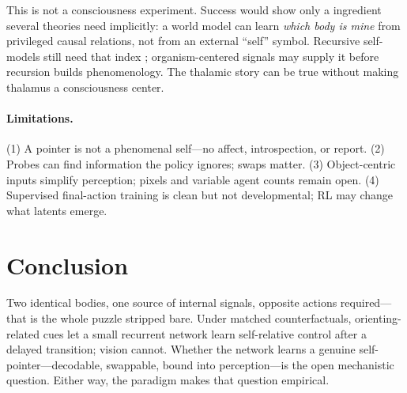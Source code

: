 \documentclass[11pt]{article}
\begin{document}
This is not a consciousness experiment. Success would show only a ingredient several theories need implicitly: a world model can learn \emph{which body is mine} from privileged causal relations, not from an external ``self'' symbol. Recursive self-models still need that index \citep{zarncke2025}; organism-centered signals may supply it before recursion builds phenomenology. The thalamic story can be true without making thalamus a consciousness center.

\paragraph{Limitations.}
(1) A pointer is not a phenomenal self---no affect, introspection, or report. (2) Probes can find information the policy ignores; swaps matter. (3) Object-centric inputs simplify perception; pixels and variable agent counts remain open. (4) Supervised final-action training is clean but not developmental; RL may change what latents emerge.

\section{Conclusion}

Two identical bodies, one source of internal signals, opposite actions required---that is the whole puzzle stripped bare. Under matched counterfactuals, orienting-related cues let a small recurrent network learn self-relative control after a delayed transition; vision cannot. Whether the network learns a genuine self-pointer---decodable, swappable, bound into perception---is the open mechanistic question. Either way, the paradigm makes that question empirical.



\end{document}
